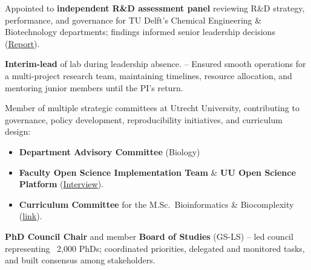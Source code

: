 \documentclass[a4paper,10pt]{article}
\begin{document}
{\begin{adjustbox}{valign=t}
\begin{minipage}[t]{0.6\textwidth}
\begin{description}
\raggedright
\item[\normalfont \textcolor{ForestGreen}{\textbf{2021 -- 2022.}}] Appointed to \textbf{independent R\&D assessment panel} reviewing R\&D strategy, performance, and governance 
  for TU Delft’s Chemical Engineering \& Biotechnology departments; findings informed senior leadership decisions 
  (\href{https://filelist.tudelft.nl/TUDelft/Onderzoek/Kwaliteitsborging/Final report SEP Chemistry TU Delft 20220204.pdf}{Report}).
\item[\normalfont \textcolor{ForestGreen}{\textbf{2019.}}] \textbf{Interim-lead} of lab during leadership absence. -- 
  Ensured smooth operations for a multi-project research team, maintaining timelines, resource allocation, and mentoring junior members until the PI’s return.
\item[\normalfont \textcolor{ForestGreen}{\textbf{2019 -- now.}}] Member of multiple strategic committees at Utrecht University, 
contributing to governance, policy development, reproducibility initiatives, and curriculum design:
  \begin{itemize}
    \item \textbf{Department Advisory Committee} (Biology) %
    \item \textbf{Faculty Open Science Implementation Team} \& \textbf{UU Open Science Platform} %
      (\href{https://www.uu.nl/en/news/meet-laura-dijkhuizen}{Interview}).
    \item \textbf{Curriculum Committee} for the M.Sc.\ Bioinformatics \& Biocomplexity %
    (\href{https://www.uu.nl/en/masters/bioinformatics-and-biocomplexity}{link}).
  \end{itemize}
  \item[\normalfont \textcolor{ForestGreen}{\textbf{2017 -- 2021.}}] \textbf{PhD Council Chair} 
    and member \textbf{Board of Studies} (GS-LS) 
      -- led council representing ~2,000 PhDs; coordinated priorities, delegated and monitored tasks, 
      and built consensus among stakeholders.
\end{description}



\end{minipage}
\end{adjustbox}}
\end{document}
